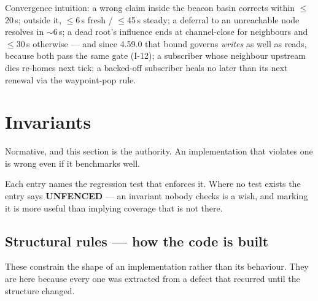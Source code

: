 \documentclass[nobib]{tufte-handout}
\begin{document}
Convergence intuition: a wrong claim inside the beacon basin corrects
within $\le$20\,s; outside it, $\le$6\,s fresh / $\le$45\,s steady; a
deferral to an unreachable node resolves in $\sim$6\,s; a dead root's
influence ends at channel-close for neighbours and $\le$30\,s
otherwise --- and since 4.59.0 that bound governs \emph{writes} as well
as reads, because both pass the same gate (I-12); a subscriber whose
neighbour upstream dies re-homes next tick; a backed-off subscriber
heals no later than its next renewal via the waypoint-pop rule.

\section{Invariants}\label{sec:invariants}

Normative, and this section is the authority. An implementation that
violates one is wrong even if it benchmarks well.


Each entry names the regression test that enforces it. Where no test
exists the entry says \textbf{UNFENCED} --- an invariant nobody checks is
a wish, and marking it is more useful than implying coverage that is not
there.

\subsection{Structural rules --- how the code is built}

These constrain the shape of an implementation rather than its
behaviour. They are here because every one was extracted from a defect
that recurred until the structure changed.
\end{document}

